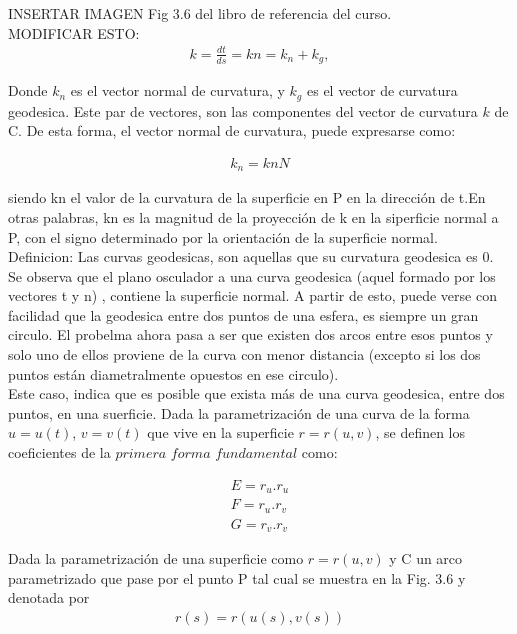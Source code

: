 \documentclass{endm}
\begin{document}
INSERTAR IMAGEN Fig 3.6 del libro de referencia del curso.\\


MODIFICAR ESTO:
\begin{align} 
 k = \frac{dt}{ds} = k n = k_n + k_g, \label{eq1tangente}
\end{align}

Donde $k_n$ es el vector normal de curvatura, y $k_g$ es el vector de curvatura geodesica. Este par de vectores, son las componentes del vector de curvatura $k$ de C. De esta forma, el vector normal de curvatura, puede expresarse como:

\begin{align} 
 k_n = kn N \label{eq2tangente}
\end{align}

siendo kn el valor de la curvatura de la superficie en P en la direcci\'on de t.En otras palabras, kn es la magnitud de la proyecci\'on de k en la siperficie normal a P, con el signo determinado por la orientaci\'on de la superficie normal.\\

Definicion: Las curvas geodesicas, son aquellas que su curvatura geodesica es 0.\\

Se observa que el plano osculador a una curva geodesica (aquel formado por los vectores t y n) , contiene la superficie normal. A partir de esto, puede verse con facilidad que la geodesica entre dos puntos de una esfera, es siempre un gran circulo. El probelma ahora pasa a ser que existen dos arcos entre esos puntos y solo uno de ellos proviene de la curva con menor distancia (excepto si los dos puntos est\'an diametralmente opuestos en ese circulo).\\

Este caso, indica que es posible que exista m\'as de una curva geodesica, entre dos puntos, en una suerficie.
Dada la parametrizaci\'on de una curva de la forma $u=u(t)$, $v=v(t)$ que vive en la superficie $r=r(u,v)$, se definen los coeficientes de la $primera$ $forma$ $fundamental$ como:

\begin{align} 
E = r_u . r_u  \label{eqE}\\ 
F = r_u . r_v  \label{eqF} \\ 
G = r_v . r_v  \label{eqG}
\end{align}
    

Dada la parametrizaci\'on de una superficie como $r=r(u,v)$ y  C un arco parametrizado que pase por el punto P tal cual se muestra en la Fig. 3.6 y denotada por
\begin{align} 
r(s) = r(u(s), v(s))
 \label{eqparametrizada}
\end{align}
\end{document}
